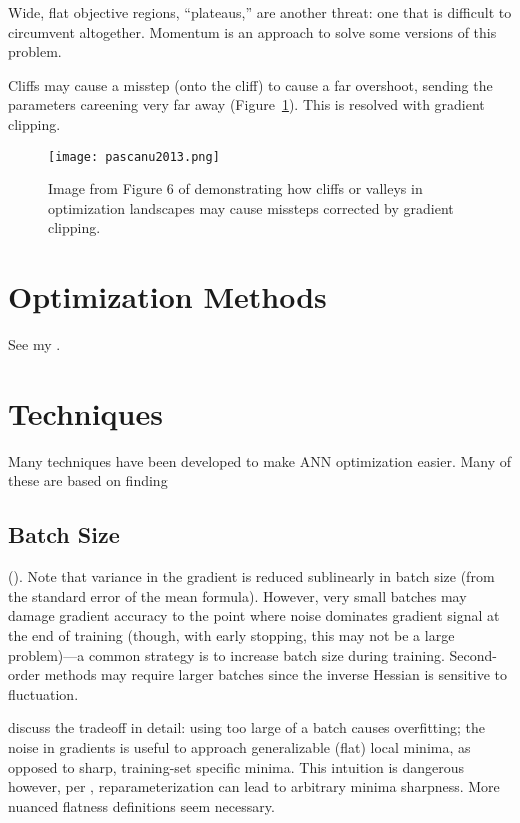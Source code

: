 \documentclass{article}
\begin{document}
Wide, flat objective regions, ``plateaus,'' are another threat: one that is difficult to circumvent altogether. Momentum is an approach to solve some versions of this problem.

Cliffs may cause a misstep (onto the cliff) to cause a far overshoot, sending the parameters careening very far away (Figure~\ref{fig:pascanu}). This is resolved with gradient clipping.

\begin{figure}[!h]
\centering
{\texttt{[image: pascanu2013.png]}}
  \caption{Image from Figure 6 of  demonstrating how cliffs or valleys in optimization landscapes may cause missteps corrected by gradient clipping.}
\label{fig:pascanu}
\end{figure}


\section{Optimization Methods}

See my .

\section{Techniques}

Many techniques have been developed to make ANN optimization easier. Many of these are based on finding 

\subsection{Batch Size}

(). Note that variance in the gradient is reduced sublinearly in batch size (from the standard error of the mean formula). However, very small batches may damage gradient accuracy to the point where noise dominates gradient signal at the end of training (though, with early stopping, this may not be a large problem)---a common strategy is to increase batch size during training. Second-order methods may require larger batches since the inverse Hessian is sensitive to fluctuation.

 discuss the tradeoff in detail: using too large of a batch causes overfitting; the noise in gradients is useful to approach generalizable (flat) local minima, as opposed to sharp, training-set specific minima. This intuition is dangerous however, per , reparameterization can lead to arbitrary minima sharpness. More nuanced flatness definitions seem necessary.
\end{document}
